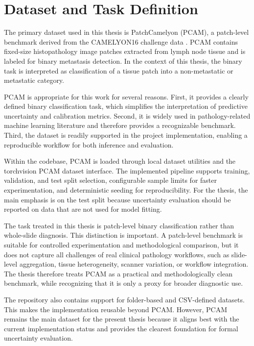 \chapter{Dataset and Task Definition}
\label{chap:dataset}

The primary dataset used in this thesis is PatchCamelyon (PCAM), a patch-level benchmark derived from the CAMELYON16 challenge data \cite{veeling2018rotation}. PCAM contains fixed-size histopathology image patches extracted from lymph node tissue and is labeled for binary metastasis detection. In the context of this thesis, the binary task is interpreted as classification of a tissue patch into a non-metastatic or metastatic category.

PCAM is appropriate for this work for several reasons. First, it provides a clearly defined binary classification task, which simplifies the interpretation of predictive uncertainty and calibration metrics. Second, it is widely used in pathology-related machine learning literature and therefore provides a recognizable benchmark. Third, the dataset is readily supported in the project implementation, enabling a reproducible workflow for both inference and evaluation.

Within the codebase, PCAM is loaded through local dataset utilities and the torchvision PCAM dataset interface. The implemented pipeline supports training, validation, and test split selection, configurable sample limits for faster experimentation, and deterministic seeding for reproducibility. For the thesis, the main emphasis is on the test split because uncertainty evaluation should be reported on data that are not used for model fitting.

The task treated in this thesis is patch-level binary classification rather than whole-slide diagnosis. This distinction is important. A patch-level benchmark is suitable for controlled experimentation and methodological comparison, but it does not capture all challenges of real clinical pathology workflows, such as slide-level aggregation, tissue heterogeneity, scanner variation, or workflow integration. The thesis therefore treats PCAM as a practical and methodologically clean benchmark, while recognizing that it is only a proxy for broader diagnostic use.

The repository also contains support for folder-based and CSV-defined datasets. This makes the implementation reusable beyond PCAM. However, PCAM remains the main dataset for the present thesis because it aligns best with the current implementation status and provides the clearest foundation for formal uncertainty evaluation.
